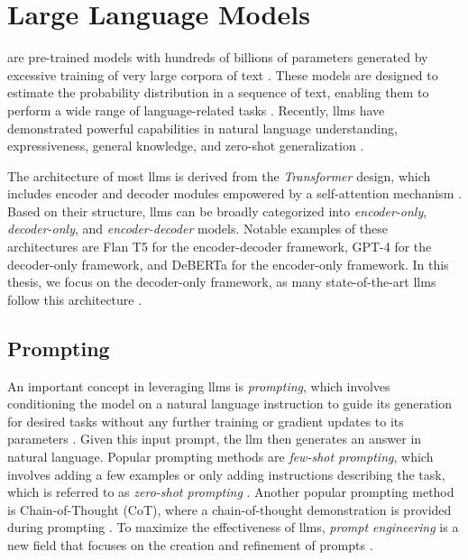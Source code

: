
\section{Large Language Models}
\label{sec:fundamentals_language_models}

 are pre-trained models with hundreds of billions of parameters generated by excessive training of very large corpora of text \cite{chung_scaling_2022}. These models are designed to estimate the probability distribution in a sequence of text, enabling them to perform a wide range of language-related tasks \cite{kojima_large_2023}. Recently, \glspl{llm} have demonstrated powerful capabilities in natural language understanding, expressiveness, general knowledge, and zero-shot generalization \cite{yang_give_2024}.

The architecture of most \glspl{llm} is derived from the \emph{Transformer} design, which includes encoder and decoder modules empowered by a self-attention mechanism \cite{pan_unifying_2024}. Based on their structure, \glspl{llm} can be broadly categorized into \emph{encoder-only}, \emph{decoder-only}, and \emph{encoder-decoder} models. Notable examples of these architectures are Flan T5 \cite{chung_scaling_2022} for the encoder-decoder framework, GPT-4 \cite{openai_gpt-4_2024} for the decoder-only framework, and DeBERTa \cite{he_deberta_2021} for the encoder-only framework. In this thesis, we focus on the decoder-only framework, as many state-of-the-art \glspl{llm} follow this architecture \cite{pan_unifying_2024}.

\subsection{Prompting} 
An important concept in leveraging \glspl{llm} is \emph{prompting}, which involves conditioning the model on a natural language instruction to guide its generation for desired tasks without any further training or gradient updates to its parameters \cite{wei_emergent_2022,kojima_large_2023}. Given this input prompt, the \gls{llm} then generates an answer in natural language. Popular prompting methods are \emph{few-shot prompting}, which involves adding a few examples \cite{brown_language_2020} or only adding instructions describing the task, which is referred to as \emph{zero-shot prompting} \cite{kojima_large_2023}. Another popular prompting method is Chain-of-Thought (CoT), where a chain-of-thought demonstration is provided during prompting \cite{wei_chain--thought_2023}. To maximize the effectiveness of \glspl{llm}, \emph{prompt engineering} is a new field that focuses on the creation and refinement of prompts \cite{pan_unifying_2024}.

